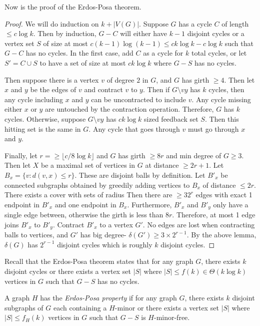 \documentclass[]{article}
\theoremstyle{definition}
\numberwithin{theorem}{section}
\numberwithin{equation}{section}
\begin{document}
Now is the proof of the Erdos-Posa theorem.
\begin{proof}
	We will do induction on $k + |V(G)|$. Suppose $G$ has a cycle $C$ of length $\leq c \log k$. Then by induction, $G - C$ will either have $k - 1$ disjoint cycles or a vertex set $S$ of size at most $c (k - 1) \log (k-1) \leq c k \log k -  c \log k$ such that $G - C$ has no cycles. In the first case, add $C$ as a cycle for $k$ total cycles, or let $S' = C \cup S$ to have a set of size at most $c k \log k$ where $G - S$ has no cycles.

	Then suppose there is a vertex $v$ of degree $2$ in $G$, and $G$ has girth $\geq 4$. Then let $x$ and $y$ be the edges of $v$ and contract $v$ to $y$. Then if $G \setminus vy$ has $k$ cycles, then any cycle including $x$ and $y$ can be uncontracted to include $v$. Any cycle missing either $x$ or $y$ are untouched by the contraction operation. Therefore, $G$ has $k$ cycles. Otherwise, suppose $G \setminus vy$ has $c k \log k$ sized feedback set $S$. Then this hitting set is the same in $G$. Any cycle that goes through $v$ must go through $x$ and $y$. 

	Finally, let $r = \geq \lfloor c/8 \log k \rfloor$ and $G$ has girth $\geq 8r$ and min degree of $G \geq 3$. Then let $X$ be a maximal set of vertices in $G$ at distance $\geq 2r + 1$. Let $B_x = \{v : d(v, x) \leq r\}$. These are disjoint balls by definition. Let $B'_x$ be connected subgraphs obtained by greedily adding vertices to $B_x$ of distance $\leq 2r$. There exists a cover with sets of radius Then there are $\geq 3 2^r$ edges with exact 1 endpoint in $B'_x$ and one endpoint in $B_x$. Furthermore, $B'_x$ and $B'_y$ only have a single edge between, otherwise the girth is less than $8r$. Therefore, at most 1 edge joins $B'_x$ to $B'_y$. Contract $B'_x$ to a vertex $G'$. No edges are lost when contracting balls to vertices, and $G'$ has big degree- $\delta(G')\geq 3 \times 2^{r - 1}$. By the above lemma, $\delta(G)$ has $2^{r - 1}$ disjoint cycles which is roughly $k$ disjoint cycles. 
\end{proof}

Recall that the Erdos-Posa theorem states that for any graph $G$, there exists $k$ disjoint cycles or there exists a vertex set $|S|$ where  $|S| \leq f(k) \in \Theta(k \log k)$ vertices in $G$ such that $G - S$ has no cycles.

A graph $H$ has the\textit{ Erdos-Posa property }if for any graph $G$, there exists $k$ disjoint subgraphs of $G$ each containing a $H$-minor or there exists a vertex set $|S|$ where  $|S| \leq f_H(k)$ vertices in $G$ such that $G - S$ is $H$-minor-free.
\end{document}
